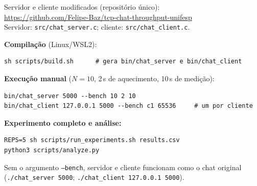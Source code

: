 \documentclass[12pt,a4paper]{article}
\newcommand{\SI}[2]{\mbox{#1\,#2}}
\begin{document}
\noindent Servidor e cliente modificados (repositório único):\\
\url{https://github.com/Felipe-Baz/tcp-chat-throughput-unifesp}\\
Servidor: \texttt{src/chat\_server.c}; cliente: \texttt{src/chat\_client.c}.

\medskip
\noindent\textbf{Compilação} (Linux/WSL2):
\begin{lstlisting}
sh scripts/build.sh      # gera bin/chat_server e bin/chat_client
\end{lstlisting}

\noindent\textbf{Execução manual} ($N=10$, \SI{2}{s} de aquecimento, \SI{10}{s} de medição):
\begin{lstlisting}
bin/chat_server 5000 --bench 10 2 10
bin/chat_client 127.0.0.1 5000 --bench c1 65536     # um por cliente
\end{lstlisting}

\noindent\textbf{Experimento completo e análise:}
\begin{lstlisting}
REPS=5 sh scripts/run_experiments.sh results.csv
python3 scripts/analyze.py
\end{lstlisting}

\noindent Sem o argumento \texttt{--bench}, servidor e cliente funcionam como o
chat original (\texttt{./chat\_server 5000}; \texttt{./chat\_client 127.0.0.1 5000}).
\end{document}
